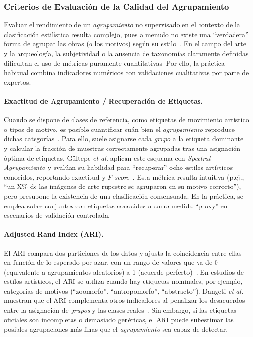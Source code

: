 \subsubsection{Criterios de Evaluación de la Calidad del Agrupamiento }
Evaluar el rendimiento de un \textit{agrupamiento} no supervisado en el contexto de la clasificación estilística resulta complejo, pues a menudo no existe una “verdadera” forma de agrupar las obras (o los motivos) según su estilo~\cite{dangeti2024}.
En el campo del arte y la arqueología, la subjetividad o la ausencia de taxonomías claramente definidas dificultan el uso de métricas puramente cuantitativas.
Por ello, la práctica habitual combina indicadores numéricos con validaciones cualitativas por parte de expertos.

\paragraph{Exactitud de Agrupamiento / Recuperación de Etiquetas.}
Cuando se dispone de clases de referencia, como etiquetas de movimiento artístico o tipos de motivo, es posible cuantificar cuán bien el \textit{agrupamiento} reproduce dichas categorías~\cite{guerin2018}.
Para ello, suele asignarse cada \textit{grupo} a la etiqueta dominante y calcular la fracción de muestras correctamente agrupadas tras una asignación óptima de etiquetas.
Gültepe \textit{et al.} aplican este esquema con \textit{Spectral Agrupamiento} y evalúan su habilidad para “recuperar” ocho estilos artísticos conocidos, reportando exactitud y \textit{F-score}~\cite{gultepe2018}.
Esta métrica resulta intuitiva (p.ej., “un X\% de las imágenes de arte rupestre se agruparon en su motivo correcto”), pero presupone la existencia de una clasificación consensuada.
En la práctica, se emplea sobre conjuntos con etiquetas conocidas o como medida “proxy” en escenarios de validación controlada.

\paragraph{Adjusted Rand Index (ARI).} El ARI compara dos particiones de los datos y ajusta la coincidencia entre ellas en función de lo esperado por azar, con un rango de valores que va de 0 (equivalente a agrupamientos aleatorios) a 1 (acuerdo perfecto)~\cite{gultepe2018,guerin2018}.
En estudios de estilos artísticos, el ARI se utiliza cuando hay etiquetas nominales, por ejemplo, categorías de motivos (“zoomorfo”, “antropomorfo”, “abstracto”).
Dangeti \textit{et al.} muestran que el ARI complementa otros indicadores al penalizar los desacuerdos entre la asignación de \textit{grupos} y las clases reales~\cite{dangeti2024}.
Sin embargo, si las etiquetas oficiales son incompletas o demasiado genéricas, el ARI puede subestimar las posibles agrupaciones más finas que el \textit{agrupamiento} sea capaz de detectar.

